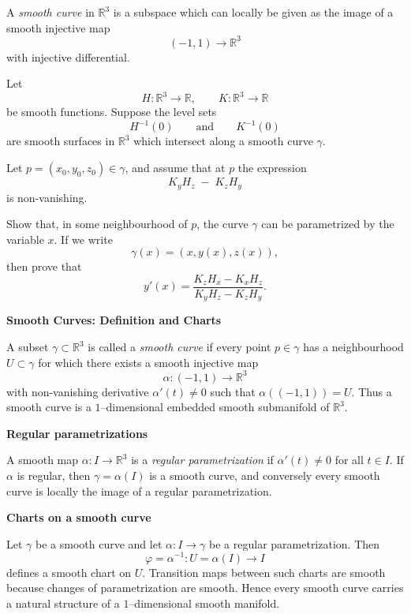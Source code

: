 \begin{problem}
\label{prob:cp-vii-0024}
A \emph{smooth curve} in $\mathbb{R}^3$ is a subspace which can locally be
	given as the image of a smooth injective map
	\[
	(-1,1) \to \mathbb{R}^3
	\]
	with injective differential.
	
	Let
	\[
	H : \mathbb{R}^3 \to \mathbb{R},
	\qquad
	K : \mathbb{R}^3 \to \mathbb{R}
	\]
	be smooth functions.
	Suppose the level sets
	\[
	H^{-1}(0)
	\qquad\text{and}\qquad
	K^{-1}(0)
	\]
	are smooth surfaces in $\mathbb{R}^3$ which intersect along a smooth curve
	$\gamma$.
	
	Let $p = (x_0,y_0,z_0) \in \gamma$, and assume that at $p$ the expression
	\[
	K_y H_z \;-\; K_z H_y
	\]
	is non-vanishing.
	
	Show that, in some neighbourhood of $p$, the curve $\gamma$ can be parametrized
	by the variable $x$.  If we write
	\[
	\gamma(x) = (x, y(x), z(x)),
	\]
	then prove that
	\[
	y'(x)
	= \frac{K_z H_x - K_x H_z}{K_y H_z - K_z H_y}.
	\]
	
	\bigskip
	
	
	\par\medskip\noindent\textbf{Smooth Curves: Definition and Charts}\par\smallskip

	
	A subset $\gamma \subset \mathbb{R}^3$ is called a \emph{smooth curve} if
	every point $p\in\gamma$ has a neighbourhood $U\subset\gamma$ for which there
	exists a smooth injective map
	\[
	\alpha : (-1,1) \longrightarrow \mathbb{R}^3
	\]
	with non-vanishing derivative $\alpha'(t)\neq 0$ such that
	$\alpha((-1,1)) = U$.
	Thus a smooth curve is a $1$--dimensional embedded smooth submanifold of
	$\mathbb{R}^3$.
	
	\par\medskip\noindent\textbf{Regular parametrizations}\par\smallskip

	A smooth map $\alpha : I \to \mathbb{R}^3$ is a \emph{regular
		parametrization} if $\alpha'(t)\neq 0$ for all $t\in I$.
	If $\alpha$ is regular, then $\gamma=\alpha(I)$ is a smooth curve, and
	conversely every smooth curve is locally the image of a regular parametrization.
	
	\par\medskip\noindent\textbf{Charts on a smooth curve}\par\smallskip

	Let $\gamma$ be a smooth curve and let
	$\alpha : I \to \gamma$ be a regular parametrization.
	Then
	\[
	\varphi = \alpha^{-1} : U=\alpha(I) \to I
	\]
	defines a smooth chart on $U$.
	Transition maps between such charts are smooth because changes of
	parametrization are smooth.
	Hence every smooth curve carries a natural structure of a $1$--dimensional
	smooth manifold.
	

\end{problem}
